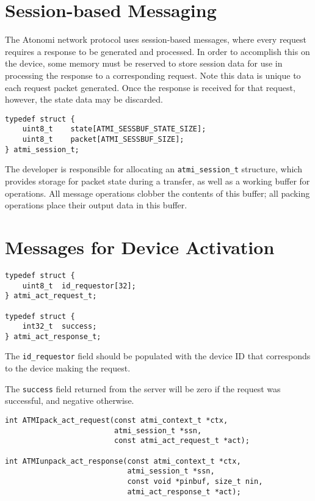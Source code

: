 \section{Session-based Messaging}
The Atonomi network protocol uses session-based messages, where every
request requires a response to be generated and processed. In order to
accomplish this on the device, some memory must be reserved to store
session data for use in processing the response to a corresponding request.
Note this data is unique to each request packet generated. Once the
response is received for that request, however, the state data may be
discarded.

\begin{lstlisting}[name=Session Structure]
typedef struct {
	uint8_t    state[ATMI_SESSBUF_STATE_SIZE];
	uint8_t    packet[ATMI_SESSBUF_SIZE];
} atmi_session_t;
\end{lstlisting}

The developer is responsible for allocating an \texttt{atmi_session_t}
structure, which provides storage for packet state during a transfer,
as well as a working buffer for operations. All message operations
clobber the contents of this buffer; all packing operations
place their output data in this buffer.



\section{Messages for Device Activation}
\begin{lstlisting}[name=Activation Request and Response Structures]
typedef struct {
	uint8_t  id_requestor[32];
} atmi_act_request_t;

typedef struct {
	int32_t  success;
} atmi_act_response_t;
\end{lstlisting}

The \texttt{id_requestor} field should be populated with the device ID that
corresponds to the device making the request.

The \texttt{success} field returned from the server will be zero if the
request was successful, and negative otherwise.

\begin{lstlisting}[name=Activation Request Packing and Response Unpacking Functions]
int ATMIpack_act_request(const atmi_context_t *ctx,
                         atmi_session_t *ssn,
                         const atmi_act_request_t *act);

int ATMIunpack_act_response(const atmi_context_t *ctx,
                            atmi_session_t *ssn,
                            const void *pinbuf, size_t nin,
                            atmi_act_response_t *act);
\end{lstlisting}

